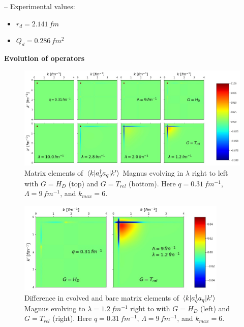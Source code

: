 \documentclass[preprintnumbers,floatfix,aps,prc,preprint,nofootinbib]{revtex4-1}
\begin{document}
-- Experimental values:
\begin{itemize}
  	\item $r_d = 2.141 \, fm$
  	\item $Q_d = 0.286 \, fm^2$
\end{itemize}
%
\textbf{Evolution of operators} %
%
\begin{figure}[H]
  	\captionsetup{singlelinecheck=false,justification=raggedright}
  	\centering
 	\includegraphics[width=14cm]{momentum_proj_operator_contours_q0,31_magnus_Wendt_Lamb9}
  	\hspace*{0.05\textwidth}
  	\caption{Matrix elements of $\mel{k}{a^{\dagger}_q a_q}{k'}$ Magnus evolving in $\lambda$ right to left with $G=H_D$ (top) and $G=T_{rel}$ (bottom). Here $q=0.31 \, fm^{-1}$, $\Lambda=9 \, fm^{-1}$, and $k_{max}=6$.}
  	\label{fig:momentum_proj_operator_contours_q0,31_magnus_Wendt_Lamb9}
\end{figure}
%
\begin{figure}[H]
	\captionsetup{singlelinecheck=false,justification=raggedright}
	\centering
  	\includegraphics[width=10cm]{momentum_proj_difference_q0,31_magnus_Wendt_Lamb9}
  	\hspace*{0.05\textwidth}
  	\caption{Difference in evolved and bare matrix elements of $\mel{k}{a^{\dagger}_q a_q}{k'}$ Magnus evolving to $\lambda=1.2 \, fm^{-1}$ right to with $G=H_D$ (left) and $G=T_{rel}$ (right). Here $q=0.31 \, fm^{-1}$, $\Lambda=9 \, fm^{-1}$, and $k_{max}=6$.}
  	\label{fig:momentum_proj_operator_difference_q0,31_magnus_Wendt_Lamb9}
\end{figure}
\end{document}
